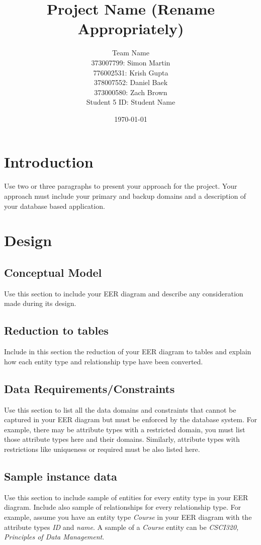 \documentclass[12pt]{article}
\title{Project Name (Rename Appropriately)}
\date{\today}
\author{Team Name \\
        373007799: Simon Martin\\
        776002531: Krish Gupta\\
        378007552: Daniel Baek\\
        373000580: Zach Brown\\
        Student 5 ID: Student Name\\
        }
\begin{document}
\maketitle

\section{Introduction}
Use two or three paragraphs to present your approach for the project. Your approach must include your primary and backup domains and a description of your database based application.

\section{Design}
\subsection{Conceptual Model}
Use this section to include your EER diagram and describe any consideration made during its design.
\subsection{Reduction to tables}
Include in this section the reduction of your EER diagram to tables and explain how each entity type and relationship type have been converted.
\subsection{Data Requirements/Constraints}
Use this section to list all the data domains and constraints that cannot be captured in your EER diagram but must be enforced by the database system. For example, there may be attribute types with a restricted domain, you must list those attribute types here and their domains. Similarly, attribute types with restrictions like uniqueness or required must be also listed here.
\subsection{Sample instance data}
Use this section to include sample of entities for every entity type in your EER diagram. Include also sample of relationships for every relationship type. For example, assume you have an entity type \emph{Course} in your EER diagram with the attribute types \emph{ID} and \emph{name}. A sample of a \emph{Course} entity can be \emph{CSCI320, Principles of Data Management}.\\
\end{document}
